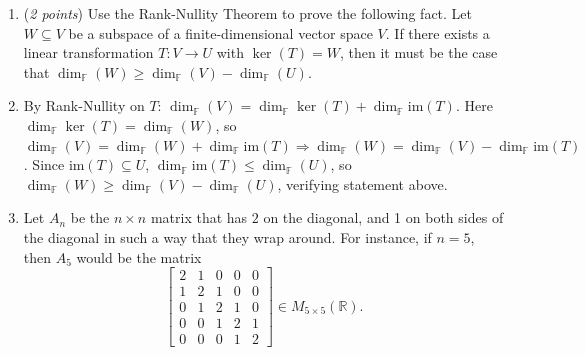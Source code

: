 \documentclass[11pt]{article}
\newcommand{\bbF}{\mathbb{F}}
\newcommand{\bbR}{\mathbb{R}}
\theoremstyle{definition}
\numberwithin{equation}{subsection}
\begin{document}
\begin{enumerate}
\begin{enumerate}
\end{enumerate}

\item (\emph{2 points}) Use the Rank-Nullity Theorem to prove the following fact. Let $W\subseteq V$ be a subspace of a finite-dimensional vector space $V$. If there exists a linear transformation $T\colon V\to U$ with $\ker(T)=W$, then it must be the case that $\dim_{\bbF}(W)\geq \dim_{\bbF}(V)-\dim_{\bbF}(U)$.
\item[] By Rank-Nullity on $T$: $\dim_\bbF (V)=\dim_\bbF \ker(T)+\dim_\bbF \text{im}(T)$. Here $\dim_\bbF \ker(T)=\dim_\bbF(W)$, so $\dim_\bbF (V)=\dim_\bbF (W)+\dim_\bbF \text{im}(T)\Rightarrow\dim_\bbF (W)=\dim_\bbF (V)-\dim_\bbF\text{im}(T)$. Since $\text{im}(T)\subseteq U$, $\dim_\bbF \text{im}(T)\leq\dim_\bbF (U)$, so $\dim_\bbF (W)\geq\dim_\bbF (V)-\dim_\bbF(U)$, verifying statement above.

\item Let $A_n$ be the $n \times n$ matrix that has $2$ on the diagonal, and 1 on both sides of the diagonal in such a way that they wrap around. For instance, if $n=5$, then $A_5$ would be the matrix
\[
\begin{bmatrix}
2 & 1 & 0 & 0 & 0 \\
1 & 2 & 1 & 0 & 0 \\
0 & 1 & 2 & 1 & 0 \\
0 & 0 & 1 & 2 & 1 \\
0 & 0 & 0 & 1 & 2 
\end{bmatrix} \in M_{5\times 5}(\bbR).
\]


\end{enumerate}
\end{document}
